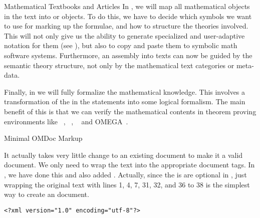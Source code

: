 \begin{omgroup}[short=Textbooks and Articles,id=algebra]{Mathematical Textbooks and Articles}
In {}, we will map all mathematical objects in the text into
{\openmath} or {\cmathml} objects. To do this, we have to decide which
symbols we want to use for marking up the formulae, and how to structure the
theories involved. This will not only give us the ability to generate specialized
and user-adaptive notation for them (see {}), but also to
copy and paste them to symbolic math software systems. Furthermore, an assembly
into texts can now be guided by the semantic theory structure, not only by the
mathematical text categories or meta-data.
   
Finally, in {} we will fully formalize the mathematical
knowledge. This involves a transformation of the
{} in the statements into some logical
formalism. The main benefit of this is that we can verify the mathematical
contents in theorem proving environments like {\nuprl}~\cite{Constable86},
{\hol}~\cite{GoMe93}, {\mizar}~\cite{Rudnicki:aomp92} and
OMEGA~\cite{BenzmuellerEtAl:otama97}.

\begin{omgroup}[id=algebra.minimal-omdoc]{Minimal OMDoc Markup}

It actually takes very little change to an existing document to make it a valid {\omdoc}
document. We only need to wrap the text into the appropriate {\xml} document tags. In
{}, we have done this and also added {}. Actually,
since the {} is are optional in {\omdoc}, just wrapping the original
text with lines 1, 4, 7, 31, 32, and 36 to 38 is the simplest way to create an {\omdoc}
document.\medskip
\begin{lstlisting}[label=lst:outerpart,mathescape,
    caption={The outer part of the document},
    index={DOCTYPE,omdoc,metadata,dc:title,dc:creator,dc:date,dc:description,dc:source,
           dc:type,dc:format,theory,omtext,h:p}]
<?xml version="1.0" encoding="utf-8"?>


\end{lstlisting}
\end{omgroup}
\end{omgroup}

